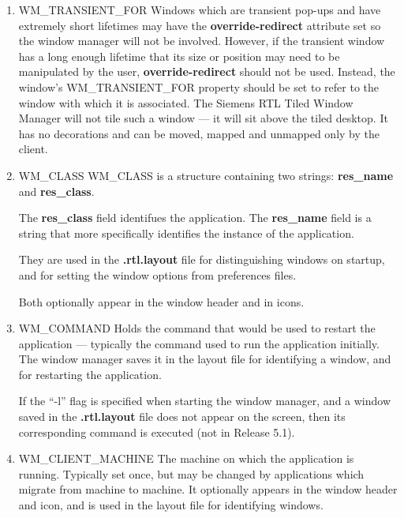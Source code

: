 \begin{enumerate}
\item 
{\sc WM\_TRANSIENT\_FOR}\newline{}
Windows which are transient pop-ups and have extremely short lifetimes
may have the {\bf override-redirect} attribute set so the window manager
will not be involved.  However, if the transient window has a long enough
lifetime that its size or position may need to be manipulated by the
user, {\bf override-redirect} should not be used.  Instead, the window's
{\sc WM\_TRANSIENT\_FOR} property should be set to refer to the window with
which it is associated.  The Siemens RTL Tiled Window Manager will not
tile such a window --- it will sit above the tiled desktop.
It has no decorations and can be moved, mapped and unmapped only by the
client.



\item 
{\sc WM\_CLASS}\newline{}
{\sc WM\_CLASS} is a structure containing two strings: {\bf res\_name} and
{\bf res\_class}.

The {\bf res\_class} field identifues the application.
The {\bf res\_name} field is a string that more specifically identifies the
instance of the application.

They are used in the {\bf .rtl.layout} file for distinguishing windows on
startup, and for setting the window options from preferences files.

Both optionally appear in the window header and in icons.


\item 
{\sc WM\_COMMAND}\newline{}
Holds the command that would be used to restart the application ---
typically the command used to run the application initially.
The window manager saves it in the layout file for identifying a window,
and for restarting the application.

If the ``-l'' flag is specified when starting the window manager, and a
window saved in the {\bf .rtl.layout} file does not appear on the screen,
then its corresponding command is executed (not in Release 5.1).



\item 
{\sc WM\_CLIENT\_MACHINE}\newline{}
The machine on which the application is running.
Typically set once, but
may be changed by applications which migrate from machine to machine.
It optionally appears in the window header and icon, and is used in the
layout file for identifying windows.



\end{enumerate}
